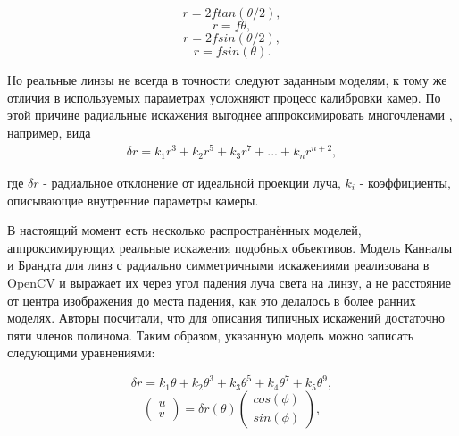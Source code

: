 \begin{eqseries}
    \begin{equation}
        \label{fy1}
    r = 2 f tan(\theta/2),  
    \end{equation}
    \begin{equation}
        \label{fy2}
    r = f \theta,
    \end{equation}
    \begin{equation}
        \label{fy3}
    r = 2 f sin(\theta/2),
    \end{equation}
    \begin{equation}
        \label{fy4}
    r = f sin(\theta).
    \end{equation}
\end{eqseries}    

Но реальные линзы не всегда в точности следуют заданным моделям, к тому же отличия в используемых параметрах усложняют процесс калибровки камер. 
По этой причине радиальные искажения выгоднее аппроксимировать многочленами \cite{opencv_model}, например, вида
 \begin{equation}	
	\begin{split}
        \delta r= k_1 r^3 + k_2 r^5 + k_3 r^7 + ... + k_n r^{n+2},
        \label{eqn:fisheye_distortion}
    \end{split}
\end{equation}

где $\delta r$ - радиальное отклонение от идеальной проекции луча,
      $k_i$ - коэффициенты, описывающие внутренние параметры камеры. 


В настоящий момент есть несколько распространённых моделей, аппроксимирующих реальные искажения подобных объективов. Модель Канналы и 
Брандта \cite{opencv_model} для линз с радиально симметричными искажениями реализована в OpenCV и выражает их через угол падения луча света на линзу, а не расстояние  
от центра изображения до места падения, как это делалось в более ранних моделях. Авторы посчитали, что для описания типичных искажений достаточно 
пяти членов полинома. Таким образом, указанную модель можно записать следующими уравнениями:
\begin{eqseries}
    \begin{equation}	
        \delta r = k_1\theta + k_2\theta^3 + k_3\theta^5 + k_4\theta^7 + k_5\theta^9,
        \label{eqn:kannala_r}
    \end{equation}
    \begin{equation}	
        \begin{pmatrix}u\\v\end{pmatrix} = \delta r(\theta)\begin{pmatrix}cos(\phi)\\sin(\phi)\end{pmatrix},
        \label{eqn:kannala_uv}
    \end{equation}
\end{eqseries}

